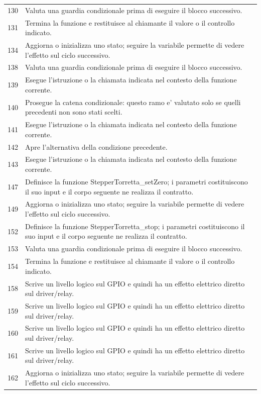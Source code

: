 \documentclass[11pt,a4paper]{article}
\begin{document}
\begin{longtable}{p{}p{}}
130 & Valuta una guardia condizionale prima di eseguire il blocco successivo. \\
131 & Termina la funzione e restituisce al chiamante il valore o il controllo indicato. \\
134 & Aggiorna o inizializza uno stato; seguire la variabile permette di vedere l'effetto sul ciclo successivo. \\
138 & Valuta una guardia condizionale prima di eseguire il blocco successivo. \\
139 & Esegue l'istruzione o la chiamata indicata nel contesto della funzione corrente. \\
140 & Prosegue la catena condizionale: questo ramo e' valutato solo se quelli precedenti non sono stati scelti. \\
141 & Esegue l'istruzione o la chiamata indicata nel contesto della funzione corrente. \\
142 & Apre l'alternativa della condizione precedente. \\
143 & Esegue l'istruzione o la chiamata indicata nel contesto della funzione corrente. \\
147 & Definisce la funzione StepperTorretta\_\allowbreak{}setZero; i parametri costituiscono il suo input e il corpo seguente ne realizza il contratto. \\
149 & Aggiorna o inizializza uno stato; seguire la variabile permette di vedere l'effetto sul ciclo successivo. \\
152 & Definisce la funzione StepperTorretta\_\allowbreak{}stop; i parametri costituiscono il suo input e il corpo seguente ne realizza il contratto. \\
153 & Valuta una guardia condizionale prima di eseguire il blocco successivo. \\
154 & Termina la funzione e restituisce al chiamante il valore o il controllo indicato. \\
158 & Scrive un livello logico sul GPIO e quindi ha un effetto elettrico diretto sul driver/relay. \\
159 & Scrive un livello logico sul GPIO e quindi ha un effetto elettrico diretto sul driver/relay. \\
160 & Scrive un livello logico sul GPIO e quindi ha un effetto elettrico diretto sul driver/relay. \\
161 & Scrive un livello logico sul GPIO e quindi ha un effetto elettrico diretto sul driver/relay. \\
162 & Aggiorna o inizializza uno stato; seguire la variabile permette di vedere l'effetto sul ciclo successivo. \\

\end{longtable}
\end{document}

